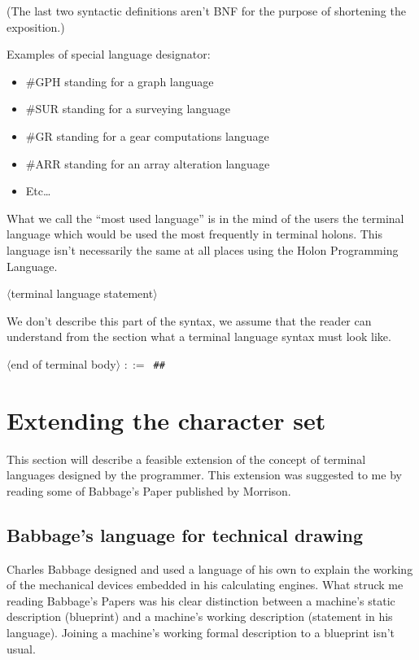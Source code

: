 \documentclass[openany,nobib]{tufte-book}
\newcommand{\sym}[1]{$\langle$#1$\rangle$}
\def\is{$::=$\ }
\begin{document}
(The last two syntactic definitions aren't BNF for the purpose of shortening
the exposition.)

    Examples of special language designator:
    \begin{itemize}
        \item[] \#GPH \quad standing for a graph language
        \item[] \#SUR \quad standing for a surveying language
        \item[] \#GR \quad standing for a gear computations language
        \item[] \#ARR \quad standing for an array alteration language
        \item[] Etc\dots
    \end{itemize}

    What we call the ``most used language'' is in the mind of the users the
terminal language which would be used the most frequently in terminal holons.
This language isn't necessarily the same at all places using the Holon
Programming Language.


\begin{tcolorbox}
\sym{terminal language statement}
\end{tcolorbox}

We don't describe this part of the syntax, we assume that the %
reader can understand from the  section
what a terminal language syntax must look like.

\begin{tcolorbox}
\sym{end of terminal body} \is {\tt\#\#}
\end{tcolorbox}

\section{Extending the character set}

This section will describe a feasible extension of the concept of terminal
languages designed by the programmer. This extension was suggested to me by
reading some of Babbage's Paper published by
Morrison.\autocite{morrison1961charles}

\subsection{Babbage's language for technical drawing}

Charles Babbage designed and used a language of his own to explain the working
of the mechanical devices embedded in his calculating engines. What struck me
reading Babbage's Papers was his clear distinction between a machine's static
description (blueprint) and a machine's working description (statement in his
language). Joining a machine's working formal description to a blueprint isn't
usual.
\end{document}
